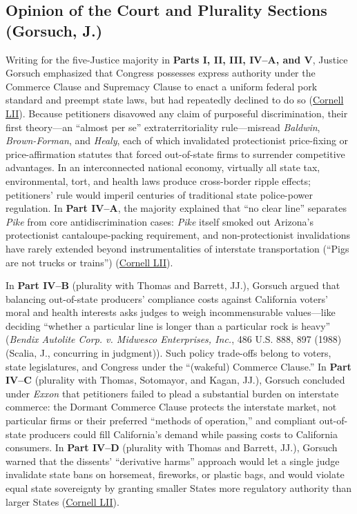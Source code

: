 \documentclass[12pt]{article}
\begin{document}
\subsection{Opinion of the Court and Plurality Sections (Gorsuch, J.)}
Writing for the five-Justice majority in \textbf{Parts I, II, III, IV--A, and V}, Justice Gorsuch emphasized that Congress possesses express authority under the Commerce Clause and Supremacy Clause to enact a uniform federal pork standard and preempt state laws, but had repeatedly declined to do so (\href{https://www.law.cornell.edu/supremecourt/text/21-468}{Cornell LII}). Because petitioners disavowed any claim of purposeful discrimination, their first theory---an ``almost per se'' extraterritoriality rule---misread \textit{Baldwin}, \textit{Brown-Forman}, and \textit{Healy}, each of which invalidated protectionist price-fixing or price-affirmation statutes that forced out-of-state firms to surrender competitive advantages. In an interconnected national economy, virtually all state tax, environmental, tort, and health laws produce cross-border ripple effects; petitioners' rule would imperil centuries of traditional state police-power regulation. In \textbf{Part IV--A}, the majority explained that ``no clear line'' separates \textit{Pike} from core antidiscrimination cases: \textit{Pike} itself smoked out Arizona's protectionist cantaloupe-packing requirement, and non-protectionist invalidations have rarely extended beyond instrumentalities of interstate transportation (``Pigs are not trucks or trains'') (\href{https://www.law.cornell.edu/supremecourt/text/21-468}{Cornell LII}).

In \textbf{Part IV--B} (plurality with Thomas and Barrett, JJ.), Gorsuch argued that balancing out-of-state producers' compliance costs against California voters' moral and health interests asks judges to weigh incommensurable values---like deciding ``whether a particular line is longer than a particular rock is heavy'' (\textit{Bendix Autolite Corp. v. Midwesco Enterprises, Inc.}, 486 U.S. 888, 897 (1988) (Scalia, J., concurring in judgment)). Such policy trade-offs belong to voters, state legislatures, and Congress under the ``(wakeful) Commerce Clause.'' In \textbf{Part IV--C} (plurality with Thomas, Sotomayor, and Kagan, JJ.), Gorsuch concluded under \textit{Exxon} that petitioners failed to plead a substantial burden on interstate commerce: the Dormant Commerce Clause protects the interstate market, not particular firms or their preferred ``methods of operation,'' and compliant out-of-state producers could fill California's demand while passing costs to California consumers. In \textbf{Part IV--D} (plurality with Thomas and Barrett, JJ.), Gorsuch warned that the dissents' ``derivative harms'' approach would let a single judge invalidate state bans on horsemeat, fireworks, or plastic bags, and would violate equal state sovereignty by granting smaller States more regulatory authority than larger States (\href{https://www.law.cornell.edu/supremecourt/text/21-468}{Cornell LII}).
\end{document}
